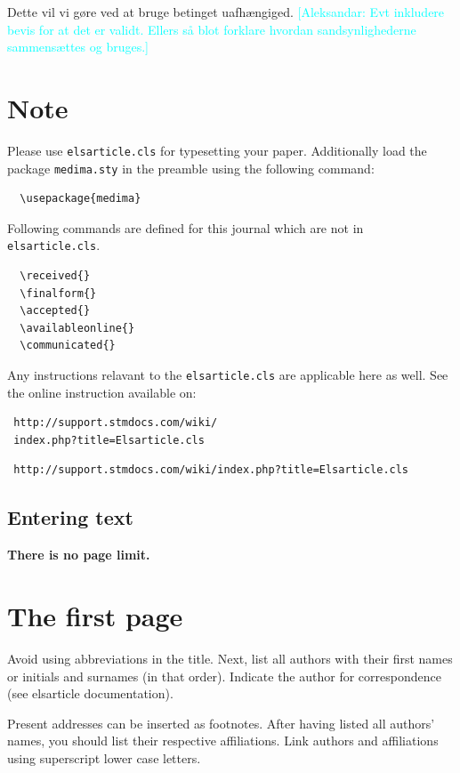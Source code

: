 \documentclass[times,twocolumn,final]{elsarticle}
\newcommand{\aleksandar}[1]{\textcolor{cyan}{[Aleksandar: #1]}}
\begin{document}
Dette vil vi gøre ved at bruge betinget uafhængiged. \aleksandar{Evt inkludere bevis for at det er validt. Ellers så blot forklare hvordan sandsynlighederne sammensættes og bruges.}


\section{Note}
\label{sec1}
Please use \verb+elsarticle.cls+ for typesetting your paper.
Additionally load the package \verb+medima.sty+ in the preamble using
the following command: 
\begin{verbatim} 
  \usepackage{medima}
\end{verbatim}

Following commands are defined for this journal which are not in
\verb+elsarticle.cls+. 
\begin{verbatim}
  \received{}
  \finalform{}
  \accepted{}
  \availableonline{}
  \communicated{}
\end{verbatim}

Any instructions relavant to the \verb+elsarticle.cls+ are applicable
here as well. See the online instruction available on:
\makeatletter
\if@twocolumn
\begin{verbatim}
 http://support.stmdocs.com/wiki/
 index.php?title=Elsarticle.cls
\end{verbatim}
\else
\begin{verbatim}
 http://support.stmdocs.com/wiki/index.php?title=Elsarticle.cls
\end{verbatim}
\fi

\subsection{Entering text}
\textcolor{newcolor}{\bf There is no page limit.}

\section{The first page}
Avoid using abbreviations in the title. Next, list all authors with
their first names or initials and surnames (in that order). Indicate
the author for correspondence (see elsarticle documentation).

Present addresses can be inserted as footnotes. After having listed all
authors' names, you should list their respective affiliations. Link
authors and affiliations using superscript lower case letters.
\end{document}
